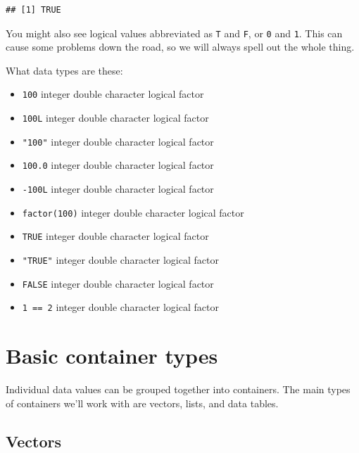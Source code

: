 \documentclass[
  oneside]{book}
\providecommand{\tightlist}{%
  \setlength{\itemsep}{0pt}\setlength{\parskip}{0pt}}
\begin{document}
\begin{verbatim}
## [1] TRUE
\end{verbatim}

\begin{info}
You might also see logical values abbreviated as \texttt{T} and \texttt{F}, or \texttt{0} and \texttt{1}. This can cause some problems down the road, so we will always spell out the whole thing.

\end{info}

\begin{try}

What data types are these:

\begin{itemize}
\tightlist
\item
  \texttt{100} integer double character logical factor
\item
  \texttt{100L} integer double character logical factor
\item
  \texttt{"100"} integer double character logical factor
\item
  \texttt{100.0} integer double character logical factor
\item
  \texttt{-100L} integer double character logical factor
\item
  \texttt{factor(100)} integer double character logical factor
\item
  \texttt{TRUE} integer double character logical factor
\item
  \texttt{"TRUE"} integer double character logical factor
\item
  \texttt{FALSE} integer double character logical factor
\item
  \texttt{1\ ==\ 2} integer double character logical factor
\end{itemize}

\end{try}

\hypertarget{containers}{%
\section{Basic container types}\label{containers}}

Individual data values can be grouped together into containers. The main types of containers we'll work with are vectors, lists, and data tables.

\hypertarget{vectors}{%
\subsection{Vectors}\label{vectors}}
\end{document}
